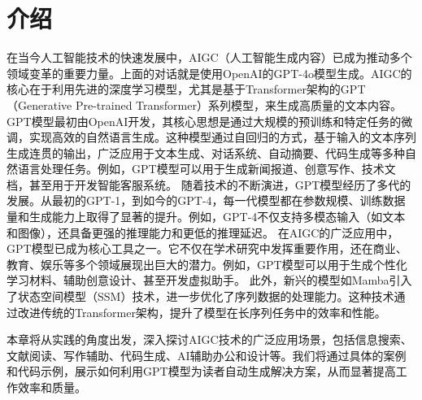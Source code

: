 \section{介绍}\label{sec:intro}




在当今人工智能技术的快速发展中，AIGC（人工智能生成内容）已成为推动多个领域变革的重要力量。上面的对话就是使用OpenAI的GPT-4o模型生成。AIGC的核心在于利用先进的深度学习模型，尤其是基于Transformer架构的GPT（Generative Pre-trained Transformer）系列模型，来生成高质量的文本内容。
GPT模型最初由OpenAI开发，其核心思想是通过大规模的预训练和特定任务的微调，实现高效的自然语言生成。这种模型通过自回归的方式，基于输入的文本序列生成连贯的输出，广泛应用于文本生成、对话系统、自动摘要、代码生成等多种自然语言处理任务。例如，GPT模型可以用于生成新闻报道、创意写作、技术文档，甚至用于开发智能客服系统。
随着技术的不断演进，GPT模型经历了多代的发展。从最初的GPT-1，到如今的GPT-4，每一代模型都在参数规模、训练数据量和生成能力上取得了显著的提升。例如，GPT-4不仅支持多模态输入（如文本和图像），还具备更强的推理能力和更低的推理延迟。
在AIGC的广泛应用中，GPT模型已成为核心工具之一。它不仅在学术研究中发挥重要作用，还在商业、教育、娱乐等多个领域展现出巨大的潜力。例如，GPT模型可以用于生成个性化学习材料、辅助创意设计、甚至开发虚拟助手。
此外，新兴的模型如Mamba引入了状态空间模型（SSM）技术，进一步优化了序列数据的处理能力。这种技术通过改进传统的Transformer架构，提升了模型在长序列任务中的效率和性能。

本章将从实践的角度出发，深入探讨AIGC技术的广泛应用场景，包括信息搜索、文献阅读、写作辅助、代码生成、AI辅助办公和设计等。我们将通过具体的案例和代码示例，展示如何利用GPT模型为读者自动生成解决方案，从而显著提高工作效率和质量。




